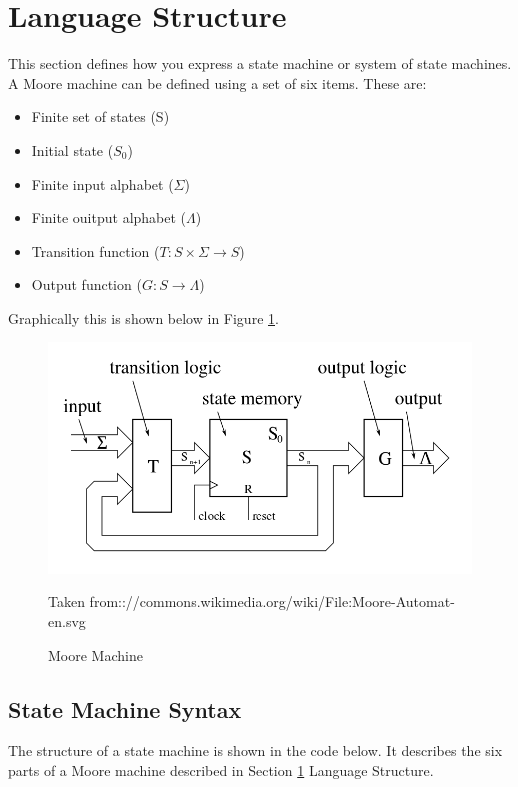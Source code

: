 \section{Language Structure}
\label{sec:LanguageStructure}
This section defines how you express a state machine or system of state
machines. A Moore machine can be defined using a set of six items. These are:

\begin{itemize}
   \item Finite set of states (S)
   \item Initial state ($S_0$)
   \item Finite input alphabet ($\Sigma$)
   \item Finite ouitput alphabet ($\Lambda$)
   \item Transition function ($T:S\times\Sigma\rightarrow S$)
   \item Output function ($G:S \rightarrow \Lambda$)
\end{itemize}

Graphically this is shown below in Figure \ref{fig:MooreMachine}.

\begin{figure}[h]
   \centering
   \includegraphics[scale=0.4]{MooreMachine}
   \caption{Moore Machine}
   \small{Taken from:://commons.wikimedia.org/wiki/File:Moore-Automat-en.svg}
   \label{fig:MooreMachine}
\end{figure}
\FloatBarrier

\subsection{State Machine Syntax}
The structure of a state machine is shown in the code below. It describes the
six parts of a Moore machine described in Section \ref{sec:LanguageStructure}
Language Structure.

